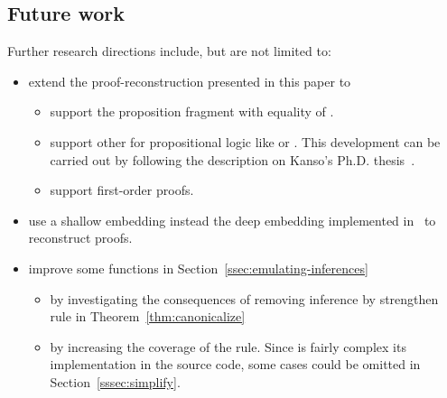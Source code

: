 \documentclass[../main.tex]{subfiles}
\begin{document}
\subsection*{Future work}

Further research directions include, but are not limited to:

\begin{itemize}
\item extend the proof-reconstruction presented in this paper to
  \begin{itemize}
    \item support the proposition fragment with equality of \Metis.
    \item support other \ATPs for propositional logic like  or . This development can be carried out by following the 
description on Kanso's Ph.D. thesis~\cite{Kanso2012}.
    \item support \Metis first-order proofs.
  \end{itemize}

\item use a shallow embedding instead the deep embedding
implemented in~\cite{AgdaProp} to reconstruct proofs.
\item improve some functions in Section~\ref{ssec:emulating-inferences}
\begin{itemize}
  \item by investigating the consequences of removing \clausify
inference by strengthen \canonicalize rule in Theorem~\ref{thm:canonicalize}
  \item by increasing the coverage of the \simplify rule. Since is fairly
complex its implementation in the \Metis source code, some cases could be omitted in Section~\ref{sssec:simplify}.
\end{itemize}


\end{itemize}
\end{document}
